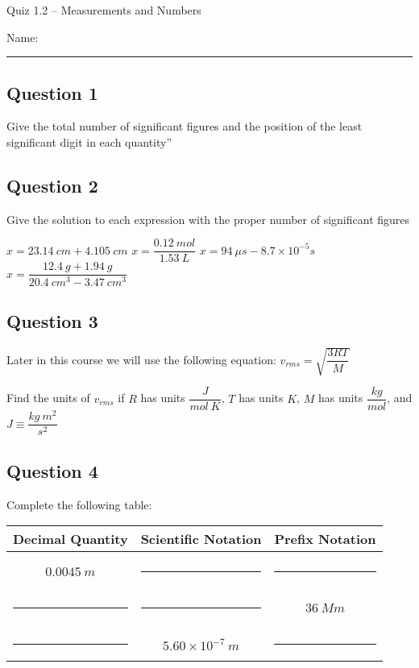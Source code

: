 \documentclass[11pt, letterpaper]{memoir}
\begin{document}
	\begin{center}
		{\large Quiz 1.2 --	Measurements and Numbers}
	\end{center}
	{\large Name: \rule[-1mm]{4in}{.1pt} 
	\subsection*{Question 1}
	Give the total number of significant figures and the position of the least significant digit in each quantity”
	
	
	\vspace{3em}
	\subsection*{Question 2}
	Give the solution to each expression with the proper number of significant figures
	
	\noindent$x = 23.14~cm+4.105~cm$ \hspace{2em} $x = \dfrac{0.12~mol}{1.53~L}$ \hspace{2em} $x=94~\mu s - 8.7\times10^{-5}s$ \hspace{2em} $x=\dfrac{12.4~g+1.94~g}{20.4~cm^3-3.47~cm^3}$  
	
	\vspace{3em}
	\subsection*{Question 3}
	Later in this course we will use the following equation: $v_{rms}=\sqrt{\dfrac{3RT}{M}}$
	
	\noindent Find the units of $v_{rms}$ if $R$ has units $\dfrac{J}{mol~K}$, $T$ has units $K$, $M$ has units $\dfrac{kg}{mol}$, and $J\equiv \dfrac{kg~m^2}{s^2}$
	
	\vspace{3em}
	\subsection*{Question 4}
	Complete the following table:
	
	\begin{tabular}{ccc}
		Decimal Quantity & Scientific Notation & Prefix Notation \\ \midrule \\
		$0.0045~m$ & \rule[-2pt]{8em}{1pt} & \rule[-2pt]{8em}{1pt} \\ \\
		\rule[-2pt]{8em}{1pt} & \rule[-2pt]{8em}{1pt} & $36~Mm$ \\ \\
		\rule[-2pt]{8em}{1pt} & $5.60\times10^{-7}~m$ & \rule[-2pt]{8em}{1pt} \\
	\end{tabular}
	



}
\end{document}

